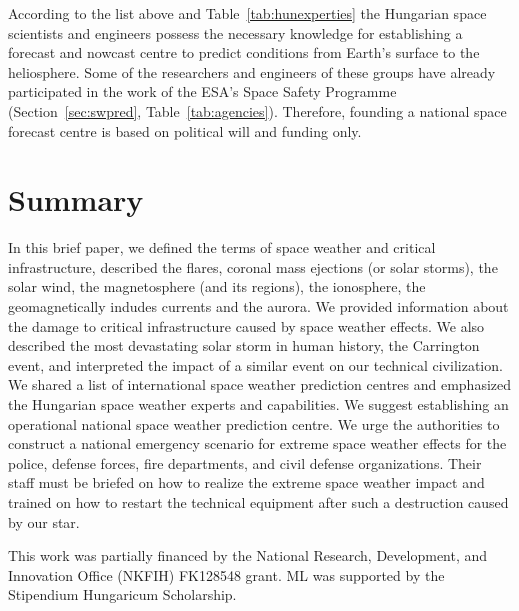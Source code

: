\documentclass[sn-aps]{sn-jnl}%
\begin{document}
According to the list above and Table~\ref{tab:hunexperties} the Hungarian space scientists and engineers possess the necessary knowledge for establishing a forecast and nowcast centre to predict conditions from Earth's surface to the heliosphere. Some of the researchers and engineers of these groups have already participated in the work of the ESA's Space Safety Programme (Section~\ref{sec:swpred}, Table~\ref{tab:agencies}). Therefore, founding a national space forecast centre is based on political will and funding only. 

\section{Summary}
\label{sec:sum}

In this brief paper, we defined the terms of space weather and critical infrastructure, described the flares, coronal mass ejections (or solar storms), the solar wind, the magnetosphere (and its regions), the ionosphere, the geomagnetically indudes currents and the aurora. We provided information about the damage to critical infrastructure caused by space weather effects. We also described the most devastating solar storm in human history, the Carrington event, and interpreted the impact of a similar event on our technical civilization. We shared a list of international space weather prediction centres and emphasized the Hungarian space weather experts and capabilities. We suggest establishing an operational national space weather prediction centre. We urge the authorities to construct a national emergency scenario for extreme space weather effects for the police, defense forces, fire departments, and civil defense organizations. Their staff must be briefed on how to realize the extreme space weather impact and trained on how to restart the technical equipment after such a destruction caused by our star. 

\backmatter


This work was partially financed by the National Research, Development, and Innovation Office (NKFIH) FK128548 grant. ML was supported by the Stipendium Hungaricum Scholarship. 

\vfill


\pagebreak

%

\end{document}
